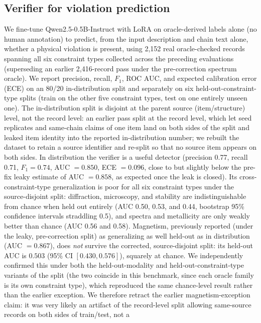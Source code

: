 \documentclass[pdflatex,sn-nature]{sn-jnl}
\begin{document}
\subsection*{Verifier for violation prediction}
We fine-tune Qwen2.5-0.5B-Instruct with LoRA on oracle-derived labels alone (no human
annotation) to predict, from the input description and chain text alone, whether a
physical violation is present, using 2{,}152 real oracle-checked records spanning all
six constraint types collected across the preceding evaluations (superseding an earlier
2{,}416-record pass under the pre-correction spectrum oracle). We report precision,
recall, $F_1$, ROC AUC, and expected calibration error (ECE) on an 80/20
in-distribution split and separately on six held-out-constraint-type splits (train on the
other five constraint types, test on one entirely unseen one). The in-distribution split
is disjoint at the parent source (item/structure) level, not the record level: an earlier
pass split at the record level, which let seed replicates and same-chain claims of one item
land on both sides of the split and leaked item identity into the reported in-distribution
number; we rebuilt the dataset to retain a source identifier and re-split so that no source
item appears on both sides. In distribution the
verifier is a useful
detector (precision 0.77, recall 0.71, $F_1=0.74$, AUC $=0.850$, ECE $=0.096$, close to but
slightly below the pre-fix leaky estimate of AUC $=0.858$, as expected once the leak is
closed). Its
cross-constraint-type generalization is poor for all six constraint types under the
source-disjoint split: diffraction, microscopy, and stability
are indistinguishable from chance when held out entirely (AUC 0.50, 0.53, and 0.44,
bootstrap 95\% confidence intervals straddling 0.5), and spectra and metallicity are only
weakly better than chance (AUC 0.56 and 0.58). Magnetism, previously reported (under
the leaky, pre-correction split) as generalizing as well held-out as in distribution
(AUC $=0.867$), does \emph{not} survive the corrected, source-disjoint split: its held-out
AUC is $0.503$ (95\% CI $[0.430,0.576]$), squarely at chance. We independently confirmed
this under both the held-out-modality and held-out-constraint-type variants of the split
(the two coincide in this benchmark, since each oracle family is its own constraint type),
which reproduced the same chance-level result rather than the earlier exception. We
therefore retract the earlier magnetism-exception claim: it was very likely an artifact of
the record-level split allowing same-source records on both sides of train/test, not a
\end{document}
